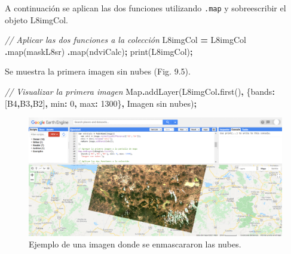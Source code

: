 \documentclass[
  12pt,
  letterpaper,
  twoside]{book}
\newenvironment{Shaded}{\begin{snugshade}}{\end{snugshade}}
\newcommand{\BuiltInTok}[1]{#1}
\newcommand{\CommentTok}[1]{\textcolor[rgb]{0.56,0.35,0.01}{\textit{#1}}}
\newcommand{\DataTypeTok}[1]{\textcolor[rgb]{0.13,0.29,0.53}{#1}}
\newcommand{\DecValTok}[1]{\textcolor[rgb]{0.00,0.00,0.81}{#1}}
\newcommand{\FunctionTok}[1]{\textcolor[rgb]{0.00,0.00,0.00}{#1}}
\newcommand{\NormalTok}[1]{#1}
\newcommand{\OperatorTok}[1]{\textcolor[rgb]{0.81,0.36,0.00}{\textbf{#1}}}
\newcommand{\StringTok}[1]{\textcolor[rgb]{0.31,0.60,0.02}{#1}}
\begin{document}
A continuación se aplican las dos funciones utilizando \texttt{.map} y sobreescribir el objeto L8imgCol.

\begin{Shaded}
\begin{Highlighting}[]
\CommentTok{// Aplicar las dos funciones a la colección}
\NormalTok{L8imgCol }\OperatorTok{=}\NormalTok{ L8imgCol}
  \OperatorTok{.}\FunctionTok{map}\NormalTok{(maskL8sr)}
  \OperatorTok{.}\FunctionTok{map}\NormalTok{(ndviCalc)}\OperatorTok{;}
\FunctionTok{print}\NormalTok{(L8imgCol)}\OperatorTok{;}
\end{Highlighting}
\end{Shaded}

Se muestra la primera imagen sin nubes (Fig. 9.5).

\begin{Shaded}
\begin{Highlighting}[]
\CommentTok{// Visualizar la primera imagen}
\BuiltInTok{Map}\OperatorTok{.}\FunctionTok{addLayer}\NormalTok{(L8imgCol}\OperatorTok{.}\FunctionTok{first}\NormalTok{()}\OperatorTok{,} 
\NormalTok{  \{}\DataTypeTok{bands}\OperatorTok{:}\NormalTok{[}\StringTok{\textquotesingle{}B4\textquotesingle{}}\OperatorTok{,}\StringTok{\textquotesingle{}B3\textquotesingle{}}\OperatorTok{,}\StringTok{\textquotesingle{}B2\textquotesingle{}}\NormalTok{]}\OperatorTok{,} \DataTypeTok{min}\OperatorTok{:} \DecValTok{0}\OperatorTok{,} \DataTypeTok{max}\OperatorTok{:} \DecValTok{1300}\NormalTok{\}}\OperatorTok{,}
  \StringTok{\textquotesingle{}Imagen sin nubes\textquotesingle{}}\NormalTok{)}\OperatorTok{;}
\end{Highlighting}
\end{Shaded}

\begin{figure}[btp]

{\centering \includegraphics[width=1\linewidth]{Img/imSinNubes} 

}

\caption{Ejemplo de una imagen donde se enmascararon las nubes.}\label{fig:unnamed-chunk-157}
\end{figure}
\end{document}
